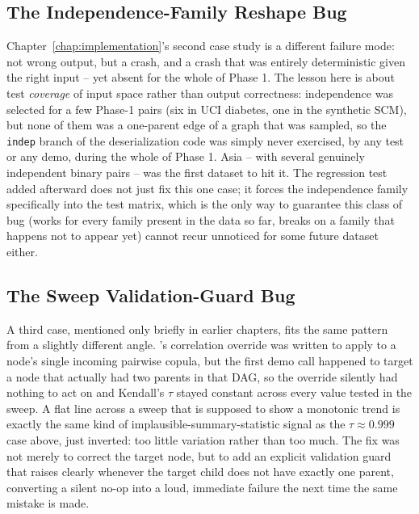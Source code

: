 \documentclass[
  english,
  class=report,
  accentcolor=2c,
  marginpar=false,
  parskip=half-,
  fontsize=11pt,
  ruledheaders=false,
  pdfa=false,
  IMRAD=false,
  thesis={type=master}
]{tudapub}
\begin{document}
\subsection{The Independence-Family Reshape Bug}
Chapter~\ref{chap:implementation}'s second case study is a different
failure mode: not wrong output, but a crash, and a crash that was entirely
deterministic given the right input -- yet absent for the whole of Phase 1.
The lesson here is about test \emph{coverage} of input space rather than
output correctness: independence was selected for a few Phase-1 pairs (six
in UCI diabetes, one in the synthetic SCM), but none of them was a
one-parent edge of a graph that was sampled, so the \texttt{indep} branch
of the deserialization code was simply never
exercised, by any test or any demo, during the whole of Phase 1. Asia -- with several
genuinely independent binary pairs -- was the first dataset to hit it. The
regression test added afterward does not just fix this one case; it forces
the independence family specifically into the test matrix, which is the
only way to guarantee this class of bug (works for every family present in
the data so far, breaks on a family that happens not to appear yet) cannot
recur unnoticed for some future dataset either.

\subsection{The Sweep Validation-Guard Bug}
A third case, mentioned only briefly in earlier chapters, fits the same
pattern from a slightly different angle. 's
correlation override was written to apply to a node's single incoming
pairwise copula, but the first demo call happened to target a node that
actually had two parents in that DAG, so the override silently had nothing
to act on and Kendall's $\tau$ stayed constant across every value tested
in the sweep. A flat line across a sweep that is supposed to show a
monotonic trend is exactly the same kind of implausible-summary-statistic
signal as the $\tau \approx 0.999$ case above, just inverted: too little
variation rather than too much. The fix was not merely to correct the
target node, but to add an explicit validation guard that raises clearly
whenever the target child does not have exactly one parent, converting a
silent no-op into a loud, immediate failure the next time the same mistake
is made.
\end{document}
